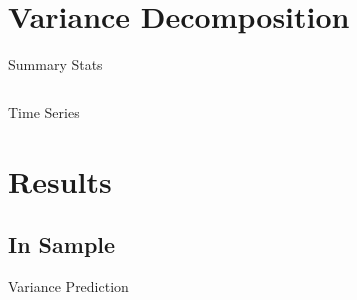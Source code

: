 \documentclass{beamer}
\begin{document}
\section{Variance Decomposition}


\begin{frame}{Summary Stats}
	\begin{table}[!htbp] \centering 
		\begin{adjustbox}{width=\textwidth}
			\begin{tabular}{lcccccc} 
				
			\end{tabular}
		\end{adjustbox}
	\end{table}
\end{frame}

\begin{frame}{Time Series}
	\begin{adjustbox}{width=\textwidth}
			
	\end{adjustbox}
\end{frame}

\section{Results}
\subsection{In Sample}

\begin{frame}{Variance Prediction}
	\vspace{-12pt}
 \begin{table}
 	\begin{adjustbox}{width=\textwidth,height=4cm}
 	
 	\end{adjustbox}

 \end{table}
\end{frame}
\end{document}
